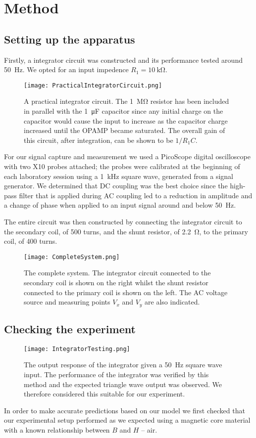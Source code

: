 \documentclass[12pt]{article}
\begin{document}
\section{Method}
\subsection{Setting up the apparatus}
Firstly, a integrator circuit was constructed and its performance tested around \SI{50}{\hertz}. We opted for an input impedence $R_1 = \SI{10}{\kilo\ohm}$.
\begin{figure}[H]
\centering
\texttt{[image: PracticalIntegratorCircuit.png]}
\caption{A practical integrator circuit. The \SI{1}{\mega\ohm} resistor has been included in parallel with the \SI{1}{\micro\farad} capacitor since any initial charge on the capacitor would cause the input to increase as the capacitor charge increased until the OPAMP became saturated. The overall gain of this circuit, after integration, can be shown to be $1/R_1 C$.}
\label{PracticalIntegrator}
\end{figure}
For our signal capture and measurement we used a PicoScope digital oscilloscope with two X10 probes attached; the probes were calibrated at the beginning of each laboratory session using a \SI{1}{\kilo\hertz} square wave, generated from a signal generator. We determined that DC coupling was the best choice since the high-pass filter that is applied during AC coupling led to a reduction in amplitude and a change of phase when applied to an input signal around and below \SI{50}{\hertz}.

The entire circuit was then constructed by connecting the integrator circuit to the secondary coil, of 500 turns, and the shunt resistor, of \SI{2.2}{\ohm}, to the primary coil, of 400 turns.
\begin{figure}[H]
\centering
\texttt{[image: CompleteSystem.png]}
\caption{The complete system. The integrator circuit connected to the secondary coil is shown on the right whilst the shunt resistor connected to the primary coil is shown on the left. The AC voltage source and measuring points $V_x$ and $V_y$ are also indicated.}
\label{CompleteSystem}
\end{figure}

\subsection{Checking the experiment}
\begin{figure}[H]
\centering
\texttt{[image: IntegratorTesting.png]}
\caption{The output response of the integrator given a \SI{50}{\hertz} square wave input. The performance of the integrator was verified by this method and the expected triangle wave output was observed. We therefore considered this suitable for our experiment.}
\label{IntegratorTesting}
\end{figure}
In order to make accurate predictions based on our model we first checked that our experimental setup performed as we expected using a magnetic core material with a known relationship between $B$ and $H$ -- air.
\end{document}

